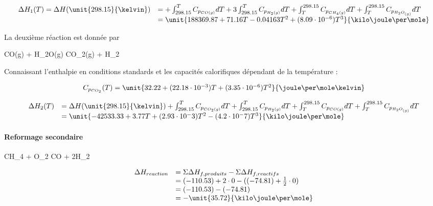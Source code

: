 $$
	\begin{array}{rl}
		 	\Delta H_1(T) = \Delta H(\unit{298.15}{\kelvin})	&=  + \int_{298.15}^{T} C_{p_{CO(g)}} dT + 3\int_{298.15}^{T} C_{p_{H_2(g)}} dT 
																														+  \int_{T}^{298.15} C_{p_{CH_4(g)}} dT + \int_{T}^{298.15}C_{p_{H_{2}O_{(g)}}}dT\\
																												&=  \unit{188369.87 + 71.16 T -0.04163 T^2 + (8.09\cdot 10^{-6}) T^3}{\kilo\joule\per\mole} %
	\end{array}
$$	

La deuxième réaction est donnée par 
\begin{chemmath} 
	CO(g) + H_{2}O(g) \Leftrightarrow CO_2(g) + H_2
\end{chemmath} 

Connaissant l'enthalpie en conditions standards \cite{atkins} et les capacités calorifiques dépendant de la température \cite{hc-table}:

$$
\begin{array}{rl}
C_{p_{CO_2}}(T) = \unit{32.22 +(22.18 \cdot 10^{-3})T + (3.35 \cdot 10^{-6})T^2}{\joule\per\mole\kelvin} \\
\end{array}
$$

$$
	\begin{array}{rl}
		  \Delta H_2(T)	&=   \Delta H(\unit{298.15}{\kelvin}) 
											 + \int_{298.15}^{T} C_{p_{CO_2(g)}} dT + \int_{298.15}^{T} C_{p_{H_2(g)}} dT 
											 +  \int_{T}^{298.15} C_{p_{CO(g)}} dT + \int_{T}^{298.15}C_{p_{H_{2}O_{(g)}}}dT \\
										&=  \unit{-42533.33+3.77T+(2.93\cdot 10^-3)T^2-(4.2\cdot 10^-7)T^3}{\kilo\joule\per\mole}
	\end{array}
$$	

\paragraph{Reformage secondaire}

\begin{chemmath}
		CH_4 + O_2 \Longrightarrow CO + 2H_2
\end{chemmath}

$$
	\begin{array}{rl}
	\Delta H_{reaction}		&= \Sigma \Delta H_{f,produits} - \Sigma \Delta H_{f,reactifs}\\
												&= (-110.53) + 2\cdot 0 - ((-74.81) + \frac{1}{2}\cdot 0)\\
												&=  (-110.53) - (-74.81)\\
												&=  -\unit{35.72}{\kilo\joule\per\mole}
	\end{array}
$$

